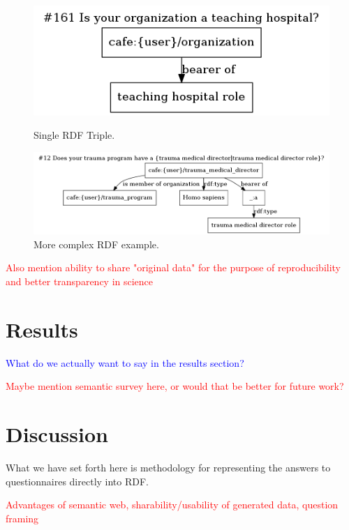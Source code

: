 \documentclass{amia}
\begin{document}
\begin{figure}[!tbp]
  \centering
  \begin{minipage}[b]{0.32\textwidth}
    \includegraphics[width=\textwidth]{pics/161.png}
    \caption{Single RDF Triple.}
    \label{simple_rdf}
  \end{minipage}
  \hfill
  \begin{minipage}[b]{0.67\textwidth}
    \includegraphics[width=\textwidth]{pics/12.png}
    \caption{More complex RDF example.}
    \label{complex_rdf}
  \end{minipage}
\end{figure}

\textcolor{red}{Also mention ability to share "original data" for the purpose of reproducibility and better transparency in science}

\section*{Results}
\textcolor{blue}{What do we actually want to say in the results section?}

\textcolor{red}{Maybe mention semantic survey here, or would that be better for future work?}

\section*{Discussion}
What we have set forth here is methodology for representing the answers to questionnaires directly into RDF.

\textcolor{red}{Advantages of semantic web, sharability/usability of generated data, question framing}
\end{document}
